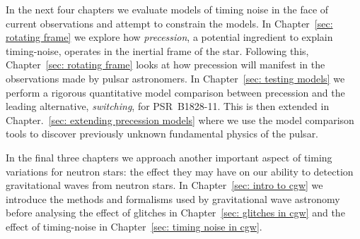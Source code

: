 \documentclass[../full_thesis/full_thesis.tex]{subfiles}
\begin{document}
In the next four chapters we evaluate models of timing noise in the face of
current observations and attempt to constrain the models.  In Chapter~\ref{sec:
rotating frame} we explore how \emph{precession}, a potential ingredient to
explain timing-noise, operates in the inertial frame of the star.  Following
this, Chapter~\ref{sec: rotating frame} looks at how precession will manifest
in the observations made by pulsar astronomers. In Chapter~\ref{sec: testing
models} we perform a rigorous quantitative model comparison between precession and the
leading alternative, \emph{switching}, for PSR~B1828-11. This is then extended
in Chapter.~\ref{sec: extending precession models} where we use the model
comparison tools to discover previously unknown fundamental physics of the
pulsar.

In the final three chapters we approach another important aspect of timing
variations for neutron stars: the effect they may have on our ability to
detection gravitational waves from neutron stars. In Chapter~\ref{sec: intro to
cgw} we introduce the methods and formalisms used by gravitational wave
astronomy before analysing the effect of glitches in Chapter~\ref{sec: glitches
in cgw} and the effect of timing-noise in Chapter~\ref{sec: timing noise in
cgw}.

\biblio
\end{document}
